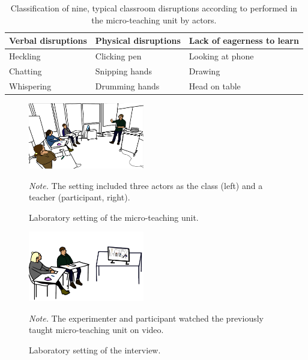 \documentclass[preprint,
3p]{elsarticle} %
\begin{document}
\renewcommand{\thefigure}{A\arabic{figure}}  %

\renewcommand{\thetable}{A\arabic{table}}

\renewcommand{\arraystretch}{1.5}

\begin{table}[ht]
    \centering
    \begin{tabularx}{\textwidth}{XXX}
        \toprule
        Verbal disruptions & Physical disruptions & Lack of eagerness to learn \\
        \midrule
        Heckling & Clicking pen & Looking at phone \\
        Chatting & Snipping hands & Drawing \\
        Whispering & Drumming hands & Head on table \\
        \bottomrule
    \end{tabularx}
    \caption{Classification of nine, typical classroom disruptions according to \cite{lohmann2003schulern} performed in the micro-teaching unit by actors.}
    \label{tab_a1}
\end{table}

\begin{figure}[htbp]
  \centering
  \includegraphics[width=0.45\textwidth]{appendix_figure1.png}
  \caption*{\textit{Note.} The setting included three actors as the class (left) and a teacher (participant, right).}
  \caption{Laboratory setting of the micro-teaching unit.}
  \label{fig.a1}
\end{figure}

\begin{figure}[htbp]
  \centering
  \includegraphics[width=0.45\textwidth]{appendix_figure2.png}
  \caption*{\textit{Note.} The experimenter and participant watched the previously taught micro-teaching unit on video.}
  \centering\caption{Laboratory setting of the interview.}
  \label{fig.a2}
\end{figure}
\end{document}
